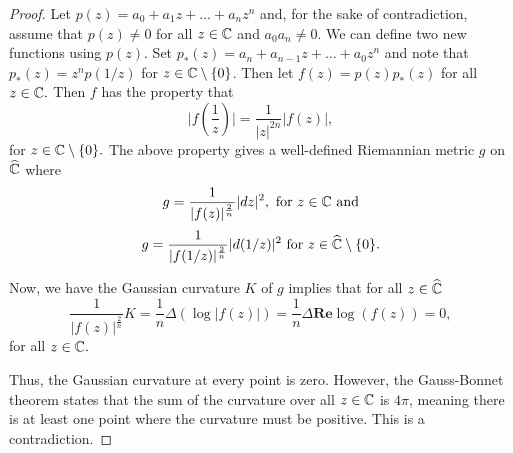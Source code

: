 \begin{proof}
 Let $p(z)=a_0+a_1z+\ldots + a_nz^n$ and, for the sake of contradiction,
 assume that $p(z)\neq 0$ for all $z\in \mathbb{C}$ and $a_0a_n\neq 0.$
 We can define two new functions using $p(z)$.
 Set $p_*(z)=a_n+a_{n-1}z+\ldots + a_0z^n$ and note that $p_*(z)=z^np(1/z)$ for $z\in \mathbb{C}\setminus\{0\}$.
 Then let $f(z)=p(z)p_*(z)$ for all $z\in \mathbb{C}.$
 Then $f$ has the property that
 $$\bigg | f\left(\frac{1}{z}\right) \bigg |=\frac{1}{|z|^{2n}}|f(z)|,$$ for $z\in \mathbb{C}\setminus\{0\}.$
 The above property gives a well-defined Riemannian metric $g$ on $\widehat{\mathbb{C}}$
 where 
 $$g=\frac{1}{|f(z)|^{\frac{2}{n}}}|dz|^2, \textrm{ for } z\in \mathbb{C} \textrm{ and}$$
 $$g=\frac{1}{|f(1/z)|^{\frac{2}{n}}}|d(1/z)|^2 \textrm{ for } z\in \widehat{\mathbb{C}}\setminus\{0\}.$$
 
 Now, we have the Gaussian curvature $K$ of $g$ implies that for all $z\in \widehat{\mathbb{C}}$
 $$\frac{1}{|f(z)|^{\frac{2}{n}}} K =\frac{1}{n}\Delta(\log |f(z)|)=\frac{1}{n}\Delta \textbf{Re} \log(f(z))=0,$$
 for all $z\in \mathbb{C}.$ 
 
Thus, the Gaussian curvature at every point is zero. However, the Gauss-Bonnet
 theorem states that the sum of the curvature over all $z\in \mathbb{C}$ is $4\pi$, meaning there is at least
 one point where the curvature must be positive. This is a contradiction.
\end{proof}


